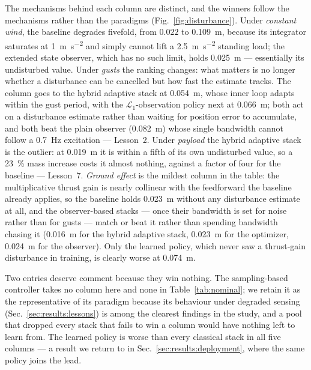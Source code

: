 The mechanisms behind each column are distinct, and the winners follow the mechanisms
rather than the paradigms (Fig.~\ref{fig:disturbance}). Under \emph{constant wind}, the baseline degrades fivefold,
from $0.022$ to \SI{0.109}{\meter}, because its integrator saturates at
\SI{1}{\meter\per\second\squared} and simply cannot lift a
\SI{2.5}{\meter\per\second\squared} standing load; the extended state observer, which
has no such limit, holds \SI{0.025}{\meter} --- essentially its undisturbed value. Under
\emph{gusts} the ranking changes: what matters is no longer whether a disturbance can be
cancelled but how fast the estimate tracks. The column goes to the hybrid adaptive stack
at \SI{0.054}{\meter}, whose inner loop adapts within the gust period, with the
$\mathcal{L}_1$-observation policy next at \SI{0.066}{\meter}; both act on a disturbance
estimate rather than waiting for position error to accumulate, and both beat the plain
observer (\SI{0.082}{\meter}) whose single bandwidth cannot follow a
\SI{0.7}{\hertz} excitation --- Lesson~2. Under \emph{payload} the hybrid
adaptive stack is the outlier: at \SI{0.019}{\meter} it is within a fifth of its own
undisturbed value, so a \SI{23}{\percent} mass increase costs it almost nothing, against
a factor of four for the baseline --- Lesson~7. \emph{Ground effect} is the mildest
column in the table: the multiplicative thrust gain is nearly collinear with the
feedforward the baseline already applies, so the baseline holds \SI{0.023}{\meter}
without any disturbance estimate at all, and the observer-based stacks --- once their
bandwidth is set for noise rather than for gusts --- match or beat it rather than
spending bandwidth chasing it (\SI{0.016}{\meter} for the hybrid adaptive stack,
\SI{0.023}{\meter} for the optimizer, \SI{0.024}{\meter} for the observer). Only the
learned policy, which never saw a thrust-gain disturbance in training, is clearly worse
at \SI{0.074}{\meter}.

Two entries deserve comment because they win nothing. The sampling-based controller
takes no column here and none in Table~\ref{tab:nominal}; we retain it as the
representative of its paradigm because its behaviour under degraded sensing
(Sec.~\ref{sec:results:lessons}) is among the clearest findings in the study, and a
pool that dropped every stack that fails to win a column would have nothing left to
learn from. The learned policy is worse than every classical stack in all five columns
--- a result we return to in Sec.~\ref{sec:results:deployment}, where the same policy
joins the lead.

